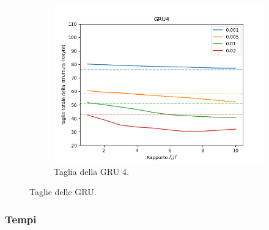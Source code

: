 \documentclass[../../main.tex]{subfiles}
\begin{document}
\begin{figure}[H]
        \begin{subfigure}[b]{0.32\textwidth}
            \centering
            \includegraphics[width = \textwidth]{immagini/7/SLBF/GRU4_Taglia.png}
            \caption{Taglia della GRU 4.}
            \label{fig:SLBFTagliaGRU4}
        \end{subfigure}
        \caption{Taglie delle GRU.}
        \label{fig:taglieGRUSLBF}
    \end{figure}
    \subsubsection{Tempi}
\end{document}
